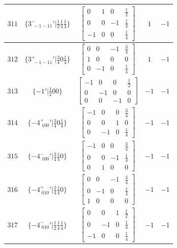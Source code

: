 \documentclass[fleqn,8pt]{jsarticle}
\begin{document}
\begin{longtable}{ccccc}
$ 311 $ & $ \{3^{-}_{\,\,-1-11}{}'|\frac{1}{2} \frac{1}{4} \frac{1}{4}\} $ & $ \begin{bmatrix} 0 & 1 & 0 & \frac{1}{2} \\ 0 & 0 & -1 & \frac{1}{4} \\ -1 & 0 & 0 & \frac{1}{4} \end{bmatrix} $ & $ 1 $ & $ -1 $ \\ \hline
$ 312 $ & $ \{3^{+}_{\,\,-1-11}{}'|\frac{3}{4} 0 \frac{1}{4}\} $ & $ \begin{bmatrix} 0 & 0 & -1 & \frac{3}{4} \\ 1 & 0 & 0 & 0 \\ 0 & -1 & 0 & \frac{1}{4} \end{bmatrix} $ & $ 1 $ & $ -1 $ \\ \hline
$ 313 $ & $ \{-1{}'|\frac{1}{2} 0 0\} $ & $ \begin{bmatrix} -1 & 0 & 0 & \frac{1}{2} \\ 0 & -1 & 0 & 0 \\ 0 & 0 & -1 & 0 \end{bmatrix} $ & $ -1 $ & $ -1 $ \\ \hline
$ 314 $ & $ \{-4^{+}_{\,\,100}{}'|\frac{3}{4} 0 \frac{1}{4}\} $ & $ \begin{bmatrix} -1 & 0 & 0 & \frac{3}{4} \\ 0 & 0 & 1 & 0 \\ 0 & -1 & 0 & \frac{1}{4} \end{bmatrix} $ & $ -1 $ & $ -1 $ \\ \hline
$ 315 $ & $ \{-4^{-}_{\,\,100}{}'|\frac{3}{4} \frac{1}{4} 0\} $ & $ \begin{bmatrix} -1 & 0 & 0 & \frac{3}{4} \\ 0 & 0 & -1 & \frac{1}{4} \\ 0 & 1 & 0 & 0 \end{bmatrix} $ & $ -1 $ & $ -1 $ \\ \hline
$ 316 $ & $ \{-4^{+}_{\,\,010}{}'|\frac{3}{4} \frac{1}{4} 0\} $ & $ \begin{bmatrix} 0 & 0 & -1 & \frac{3}{4} \\ 0 & -1 & 0 & \frac{1}{4} \\ 1 & 0 & 0 & 0 \end{bmatrix} $ & $ -1 $ & $ -1 $ \\ \hline
$ 317 $ & $ \{-4^{-}_{\,\,010}{}'|\frac{1}{2} \frac{1}{4} \frac{1}{4}\} $ & $ \begin{bmatrix} 0 & 0 & 1 & \frac{1}{2} \\ 0 & -1 & 0 & \frac{1}{4} \\ -1 & 0 & 0 & \frac{1}{4} \end{bmatrix} $ & $ -1 $ & $ -1 $ \\ \hline

\end{longtable}
\end{document}
